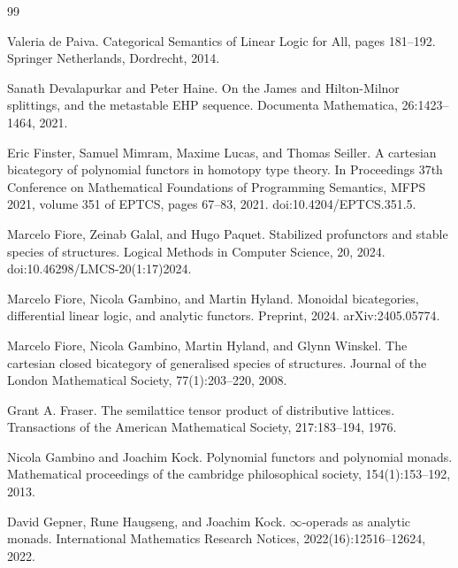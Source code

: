 \begin{thebibliography}{99}
\par\noindent    Valeria de Paiva.  Categorical Semantics of Linear Logic for All, pages 181–192.  Springer Netherlands, Dordrecht, 2014.  

\par\noindent    Sanath Devalapurkar and Peter Haine.  On the James and Hilton-Milnor splittings, and the metastable EHP sequence.  Documenta Mathematica, 26:1423–1464, 2021.  

\par\noindent    Eric Finster, Samuel Mimram, Maxime Lucas, and Thomas Seiller.  A cartesian bicategory of polynomial functors in homotopy type theory.  In Proceedings 37th Conference on Mathematical Foundations of Programming Semantics, MFPS 2021, volume 351 of EPTCS, pages 67–83, 2021.  doi:10.4204/EPTCS.351.5.  

\par\noindent    Marcelo Fiore, Zeinab Galal, and Hugo Paquet.  Stabilized profunctors and stable species of structures.  Logical Methods in Computer Science, 20, 2024.  doi:10.46298/LMCS-20(1:17)2024.  

\par\noindent    Marcelo Fiore, Nicola Gambino, and Martin Hyland.  Monoidal bicategories, differential linear logic, and analytic functors.  Preprint, 2024.  arXiv:2405.05774.  

\par\noindent    Marcelo Fiore, Nicola Gambino, Martin Hyland, and Glynn Winskel.  The cartesian closed bicategory of generalised species of structures.  Journal of the London Mathematical Society, 77(1):203–220, 2008.  

\par\noindent    Grant A. Fraser.  The semilattice tensor product of distributive lattices.  Transactions of the American Mathematical Society, 217:183–194, 1976.  

\par\noindent    Nicola Gambino and Joachim Kock.  Polynomial functors and polynomial monads.  Mathematical proceedings of the cambridge philosophical society, 154(1):153–192, 2013.  

\par\noindent    David Gepner, Rune Haugseng, and Joachim Kock.  $\infty$-operads as analytic monads.  International Mathematics Research Notices, 2022(16):12516–12624, 2022.  


\end{thebibliography}
